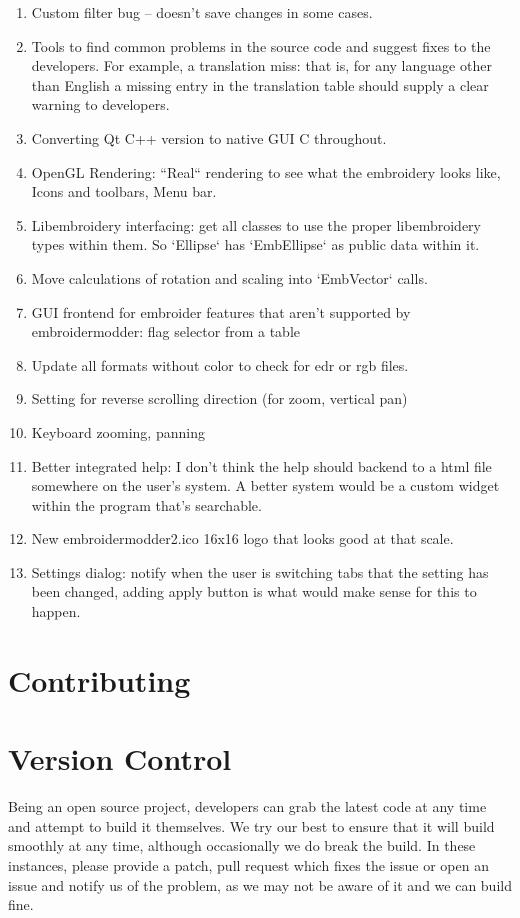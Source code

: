 \documentclass{report}
\begin{document}
\begin{enumerate}
\item Custom filter bug -- doesn't save changes in some cases.
\item Tools to find common problems in the source code and suggest fixes to the developers. For example, a translation miss: that is, for any language other than English a missing entry in the translation table should supply a clear warning to developers.
\item Converting Qt C++ version to native GUI C throughout.
\item OpenGL Rendering: ``Real`` rendering to see what the embroidery looks like, Icons and toolbars, Menu bar.
\item Libembroidery interfacing: get all classes to use the proper libembroidery types within them. So `Ellipse` has `EmbEllipse` as public data within it.
\item Move calculations of rotation and scaling into `EmbVector` calls.
\item GUI frontend for embroider features that aren't supported by embroidermodder: flag selector from a table
\item Update all formats without color to check for edr or rgb files.
\item Setting for reverse scrolling direction (for zoom, vertical pan)
\item Keyboard zooming, panning
\item Better integrated help: I don't think the help should backend to a html file somewhere on the user's system. A better system would be a custom widget within the program that's searchable.
\item New embroidermodder2.ico 16x16 logo that looks good at that scale.
\item Settings dialog: notify when the user is switching tabs that the setting has been changed, adding apply button is what would make sense for this to happen.
\end{enumerate}

\section{Contributing}

\section{Version Control}

Being an open source project, developers can grab the latest code at any time
and attempt to build it themselves. We try our best to ensure that it will build smoothly
at any time, although occasionally we do break the build. In these instances,
please provide a patch, pull request which fixes the issue or open an issue and
notify us of the problem, as we may not be aware of it and we can build fine.
\end{document}
